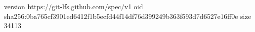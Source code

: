 version https://git-lfs.github.com/spec/v1
oid sha256:0ba765cf3901ed6412f1b5ecfd44f14df76d399249b363f593d7d6527e16ff0e
size 34113

